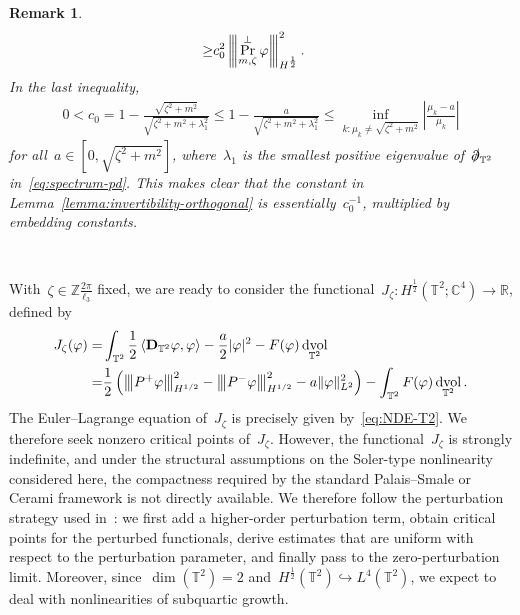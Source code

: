 \documentclass[10pt,a4paper]{amsart}
\newcommand{\tnorm}[1]{%
  \left\vert\kern-0.3ex\left\vert\kern-0.3ex\left\vert #1 \right\vert\kern-0.3ex\right\vert\kern-0.3ex\right\vert
}
\newcommand{\R}{\mathbb{R}}
\newcommand{\C}{\mathbb{C}}
\newcommand{\T}{\mathbb{T}}
\newcommand{\pd}{\slashed{\partial}}
\newcommand{\dd}{\mathop{}\!\mathrm{d}}
\newcommand{\pD}{\mathbf{D}}
\newcommand{\Abracket}[1]{\left<#1\right>} %
\newcommand{\parenthesis}[1]{\left(#1\right)} %
\newcommand{\bZ}{\mathbb{Z}}
\DeclareMathOperator{\dv}{\dd{vol}}
\DeclareMathOperator{\proj}{Pr}
\newtheorem{rmk}[thm]{Remark}
\begin{document}
\begin{rmk}
\begin{align}
        \geq& c_0^2 \tnorm{\proj_{m,\zeta}^\perp \varphi }_{H^{\frac{1}{2}}}^2.
    \end{align}
    In the last inequality, 
    \begin{align}
        0<c_0=1-\frac{\sqrt{\zeta^2+m^2}}{\sqrt{\zeta^2+m^2+\lambda_1^2}} 
        \leq 1-\frac{a}{\sqrt{\zeta^2+m^2+\lambda_1^2}}
        \leq \inf_{k\colon \mu_k\neq\sqrt{\zeta^2+m^2}} \left|\frac{\mu_k-a}{\mu_k}\right| 
    \end{align}
    for all~$a\in [0,\sqrt{\zeta^2+m^2}]$, where~$\lambda_1$ is the smallest positive eigenvalue of~$\pd_{\T^2}$ in~\eqref{eq:spectrum-pd}.
    This makes clear that the constant in Lemma~\ref{lemma:invertibility-orthogonal} is essentially~$c_0^{-1}$, multiplied by embedding constants.
\end{rmk}


\

With~$\zeta\in\bZ\frac{2\pi}{\ell_3}$ fixed, we are ready to consider the functional~$J_{\zeta}\colon H^{\frac{1}{2}}(\mathbb{T}^2;\C^4)\to \R$, defined by 
\begin{align}\label{eq:functional-T2}
    J_\zeta (\varphi)
    =&\int_{\T^2} \frac{1}{2}\Abracket{\pD_{\T^2} \varphi,\varphi }
     -\frac{a}{2}|\varphi|^2 -F(\varphi)\dv_{\T^2}
    \\
    =&\frac{1}{2}\parenthesis{ \tnorm{P^+\varphi}_{H^{1/2}}^2 
     - \tnorm{P^-\varphi }_{H^{1/2}}^2 
     -a\|\varphi\|_{L^2}^2 }
     -\int_{\T^2} F(\varphi)\dv_{\T^2}.
\end{align}
The Euler--Lagrange equation of~$J_\zeta$ is precisely given by~\eqref{eq:NDE-T2}.
We therefore seek nonzero critical points of~$J_{\zeta}$. 
However, the functional~$J_\zeta$ is strongly indefinite, and under the structural assumptions on the Soler-type nonlinearity considered here, the compactness required by the standard Palais--Smale or Cerami framework is not directly available. 
We therefore follow the perturbation strategy used in~\cite{WZ2026Stationary}: we first add a higher-order perturbation term, obtain critical points for the perturbed functionals, derive estimates that are uniform with respect to the perturbation parameter, and finally pass to the zero-perturbation limit.
Moreover, since~$\dim (\mathbb{T}^2)=2$ and~$H^{\frac{1}{2}}(\T^2)\hookrightarrow L^4(\T^2)$, we expect to deal with nonlinearities of subquartic growth. 
\end{document}
